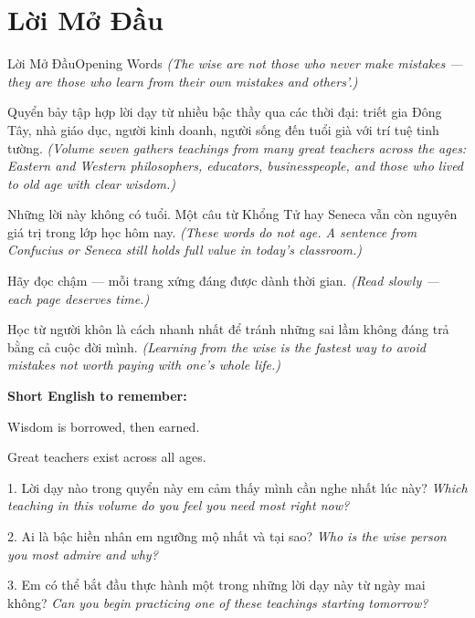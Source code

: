 \chapter*{Lời Mở Đầu}

\begin{truyen}{Lời Mở Đầu}{Opening Words}
\textit{(The wise are not those who never make mistakes --- they are those who learn from their own mistakes and others'.)}

Quyển bảy tập hợp lời dạy từ nhiều bậc thầy qua các thời đại: triết gia Đông Tây, nhà giáo dục, người kinh doanh, người sống đến tuổi già với trí tuệ tinh tường.
\textit{(Volume seven gathers teachings from many great teachers across the ages: Eastern and Western philosophers, educators, businesspeople, and those who lived to old age with clear wisdom.)}

Những lời này không có tuổi. Một câu từ Khổng Tử hay Seneca vẫn còn nguyên giá trị trong lớp học hôm nay.
\textit{(These words do not age. A sentence from Confucius or Seneca still holds full value in today's classroom.)}

Hãy đọc chậm — mỗi trang xứng đáng được dành thời gian.
\textit{(Read slowly --- each page deserves time.)}
\end{truyen}

\begin{baihoc}
Học từ người khôn là cách nhanh nhất để tránh những sai lầm không đáng trả bằng cả cuộc đời mình.
\textit{(Learning from the wise is the fastest way to avoid mistakes not worth paying with one's whole life.)}
\end{baihoc}

\begin{tcolorbox}[colback=truyenblue!6,colframe=truyenblue,coltitle=white,fonttitle=\bfseries,title={Easy English},arc=4pt,boxrule=1pt,breakable]
\textbf{Short English to remember:}

Wisdom is borrowed, then earned.

Great teachers exist across all ages.
\end{tcolorbox}

\begin{tcolorbox}[colback=truyengold!10,colframe=truyengold!70!black,coltitle=black,fonttitle=\bfseries,title={Tự Học Nhanh},arc=4pt,boxrule=1pt,breakable]
1. Lời dạy nào trong quyển này em cảm thấy mình cần nghe nhất lúc này? \textit{Which teaching in this volume do you feel you need most right now?}

2. Ai là bậc hiền nhân em ngưỡng mộ nhất và tại sao? \textit{Who is the wise person you most admire and why?}

3. Em có thể bắt đầu thực hành một trong những lời dạy này từ ngày mai không? \textit{Can you begin practicing one of these teachings starting tomorrow?}
\end{tcolorbox}

\ngancach
